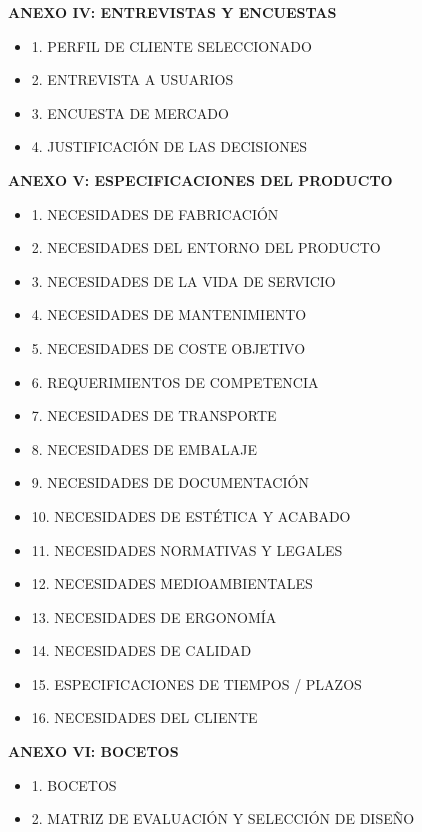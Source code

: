 \documentclass[11pt,a4paper]{article}
\begin{document}
\begin{description}[style=nextline, leftmargin=0.5cm, font=\bfseries\color{ArthroNavy}]
\begin{itemize}[label=\color{ArthroGray}\circ, leftmargin=0.5cm, itemsep=0.2em, topsep=0.1cm]
        \end{itemize}
        
        \item \textbf{ANEXO IV: ENTREVISTAS Y ENCUESTAS} 
        \begin{itemize}[label=\color{ArthroGray}\circ, leftmargin=0.5cm, itemsep=0.2em, topsep=0.1cm]
            \small
            \item 1. PERFIL DE CLIENTE SELECCIONADO 
            \item 2. ENTREVISTA A USUARIOS 
            \item 3. ENCUESTA DE MERCADO
            \item 4. JUSTIFICACIÓN DE LAS DECISIONES 
        \end{itemize}
        
        \item \textbf{ANEXO V: ESPECIFICACIONES DEL PRODUCTO} 
        \begin{itemize}[label=\color{ArthroGray}\circ, leftmargin=0.5cm, itemsep=0.2em, topsep=0.1cm]
            \small
            \item 1. NECESIDADES DE FABRICACIÓN 
            \item2. NECESIDADES DEL ENTORNO DEL PRODUCTO 
            \item3. NECESIDADES DE LA VIDA DE SERVICIO
            \item4. NECESIDADES DE MANTENIMIENTO 
            \item5. NECESIDADES DE COSTE OBJETIVO 
            \item6. REQUERIMIENTOS DE COMPETENCIA 
           \item 7. NECESIDADES DE TRANSPORTE 
            \item8. NECESIDADES DE EMBALAJE 
            \item9. NECESIDADES DE DOCUMENTACIÓN 
            \item10. NECESIDADES DE ESTÉTICA Y ACABADO 
            \item11. NECESIDADES NORMATIVAS Y LEGALES 
            \item12. NECESIDADES MEDIOAMBIENTALES 
            \item13. NECESIDADES DE ERGONOMÍA 
            \item14. NECESIDADES DE CALIDAD 
            \item15. ESPECIFICACIONES DE TIEMPOS / PLAZOS 
            \item16. NECESIDADES DEL CLIENTE 
        \end{itemize}
        
        \item \textbf{ANEXO VI: BOCETOS} 
        \begin{itemize}[label=\color{ArthroGray}\circ, leftmargin=0.5cm, itemsep=0.2em, topsep=0.1cm]
            \small
            \item 1. BOCETOS 
            \item 2. MATRIZ DE EVALUACIÓN Y SELECCIÓN DE DISEÑO 
            

\end{itemize}
\end{description}
\end{document}

